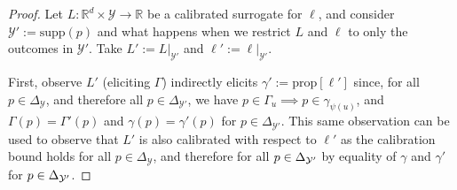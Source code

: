 \documentclass{article}
\newcommand{\reals}{\mathbb{R}}
\newcommand{\simplex}{\Delta_\Y}
\newcommand{\prop}[1]{\mathrm{prop}[#1]}
\newcommand{\supp}{\mathrm{supp}}
\newcommand{\Y}{\mathcal{Y}}
\begin{document}
\hariresult*
\begin{proof}
	Let $L : \reals^d \times \Y \to \reals$ be a calibrated surrogate for $\ell$, and consider $\Y' := \supp(p)$ and what happens when we restrict $L$ and $\ell$ to only the outcomes in $\Y'$.
	Take $L' := L|_{\Y'}$ and $\ell' := \ell|_{\Y'}$.
	
	First, observe $L'$ (eliciting $\Gamma$) indirectly elicits $\gamma' := \prop{\ell'}$ since, for all $p \in \simplex$, and therefore all $p \in \Delta_{\Y'}$, we have $p \in \Gamma_u \implies p \in \gamma_{\psi(u)}$, and $\Gamma(p) = \Gamma'(p)$ and $\gamma(p) = \gamma'(p)$ for $p \in \Delta_{\Y'}$.
	This same observation can be used to observe that $L'$ is also calibrated with respect to $\ell'$ as the calibration bound holds for all $p \in \simplex$, and therefore for all $p \in \simplexp$ by equality of $\gamma$ and $\gamma'$ for $p \in \simplexp$.
	

\end{proof}
\end{document}
